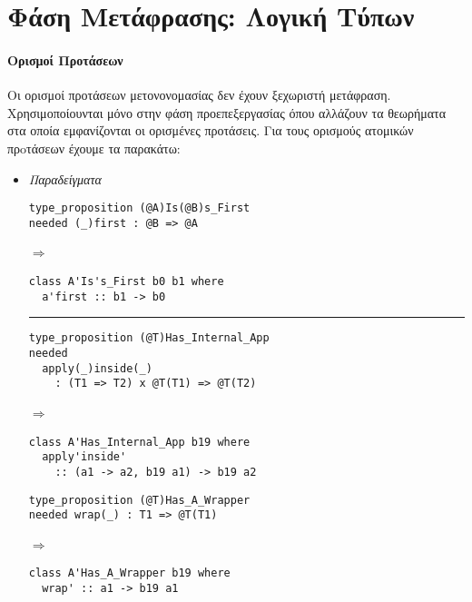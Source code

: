 \documentclass[diploma]{softlab-thesis}
\def\lra{$\Longrightarrow$\ }
\begin{document}
\newpage

\section{Φάση Μετάφρασης: Λογική Τύπων}

\paragraph{Ορισμοί Προτάσεων}

Οι ορισμοί προτάσεων μετονονομασίας δεν έχουν ξεχωριστή μετάφραση.
Χρησιμοποίουνται μόνο στην φάση προεπεξεργασίας όπου αλλάζουν τα θεωρήματα στα
οποία εμφανίζονται οι ορισμένες προτάσεις. Για τους ορισμούς ατομικών πρoτάσεων
έχουμε τα παρακάτω:

\begin{itemize}

\item
\textit{Παραδείγματα}\\

\begin{minipage}{0.45\linewidth}
\begin{verbatim}
type_proposition (@A)Is(@B)s_First
needed (_)first : @B => @A
\end{verbatim}

\lra

\begin{verbatim}
class A'Is's_First b0 b1 where
  a'first :: b1 -> b0
\end{verbatim}

\rule{\linewidth}{0.1pt}

\begin{verbatim}
type_proposition (@T)Has_Internal_App
needed
  apply(_)inside(_)
    : (T1 => T2) x @T(T1) => @T(T2)
\end{verbatim}

\lra

\begin{verbatim}
class A'Has_Internal_App b19 where
  apply'inside'
    :: (a1 -> a2, b19 a1) -> b19 a2
\end{verbatim}
\end{minipage}
\hfill\vline\hfill
\begin{minipage}{0.40\linewidth}
\begin{verbatim}
type_proposition (@T)Has_A_Wrapper
needed wrap(_) : T1 => @T(T1)
\end{verbatim}

\lra

\begin{verbatim}
class A'Has_A_Wrapper b19 where
  wrap' :: a1 -> b19 a1
\end{verbatim}


\end{minipage}
\end{itemize}
\end{document}
